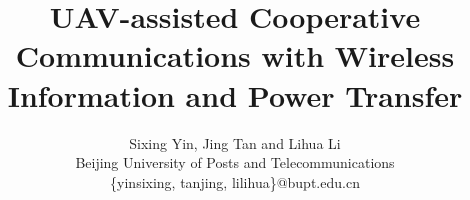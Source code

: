 \documentclass[12pt, draftclsnofoot, onecolumn]{IEEEtran}
\begin{document}
%
\title{UAV-assisted Cooperative Communications with Wireless Information and Power Transfer}
%
%
%

\author{\normalsize Sixing Yin, Jing Tan and Lihua Li\\
Beijing University of Posts and Telecommunications \\  \{yinsixing, tanjing, lilihua\}@bupt.edu.cn\\
}

% 
%
\end{document}
